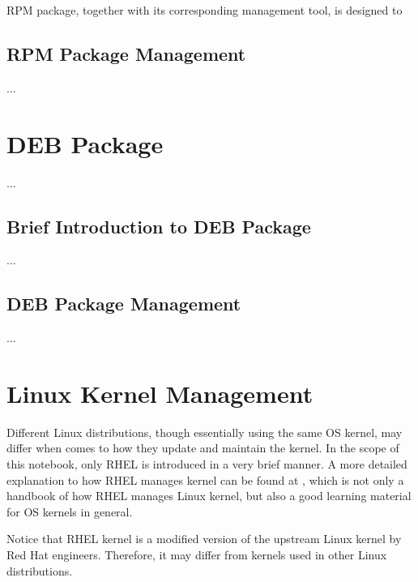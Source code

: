RPM package, together with its corresponding management tool, is designed to 

\subsection{RPM Package Management}

...

\section{DEB Package}
...
\subsection{Brief Introduction to DEB Package}
...
\subsection{DEB Package Management}
...
\section{Linux Kernel Management}

Different Linux distributions, though essentially using the same OS kernel, may differ when comes to how they update and maintain the kernel. In the scope of this notebook, only RHEL is introduced in a very brief manner. A more detailed explanation to how RHEL manages kernel can be found at \cite{redhat2022kernel}, which is not only a handbook of how RHEL manages Linux kernel, but also a good learning material for OS kernels in general.

Notice that RHEL kernel is a modified version of the upstream Linux kernel by Red Hat engineers. Therefore, it may differ from kernels used in other Linux distributions.
















